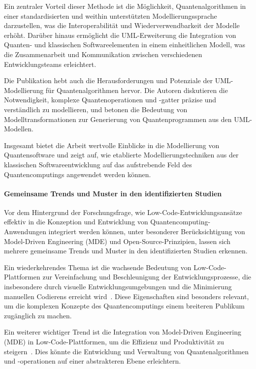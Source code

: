 Ein zentraler Vorteil dieser Methode ist die Möglichkeit, Quantenalgorithmen in einer standardisierten und 
weithin unterstützten Modellierungssprache darzustellen, was die Interoperabilität und Wiederverwendbarkeit 
der Modelle erhöht. Darüber hinaus ermöglicht die UML-Erweiterung die Integration von Quanten- und klassischen 
Softwareelementen in einem einheitlichen Modell, was die Zusammenarbeit und Kommunikation zwischen verschiedenen 
Entwicklungsteams erleichtert.

Die Publikation hebt auch die Herausforderungen und Potenziale der UML-Modellierung für Quantenalgorithmen hervor. 
Die Autoren diskutieren die Notwendigkeit, komplexe Quantenoperationen und -gatter präzise und verständlich zu 
modellieren, und betonen die Bedeutung von Modelltransformationen zur Generierung von Quantenprogrammen aus den UML-Modellen.

Insgesamt bietet die Arbeit wertvolle Einblicke in die Modellierung von Quantensoftware und zeigt auf, wie 
etablierte Modellierungstechniken aus der klassischen Softwareentwicklung auf das aufstrebende Feld des 
Quantencomputings angewendet werden können.

\paragraph{Gemeinsame Trends und Muster in den identifizierten Studien}

Vor dem Hintergrund der Forschungsfrage, wie Low-Code-Entwicklungsansätze effektiv in die Konzeption 
und Entwicklung von Quantencomputing-Anwendungen integriert werden können, unter besonderer Berücksichtigung 
von Model-Driven Engineering (MDE) und Open-Source-Prinzipien, lassen sich mehrere gemeinsame Trends und 
Muster in den identifizierten Studien erkennen.

Ein wiederkehrendes Thema ist die wachsende Bedeutung von Low-Code-Plattformen zur Vereinfachung und 
Beschleunigung der Entwicklungsprozesse, die insbesondere durch visuelle Entwicklungsumgebungen und 
die Minimierung manuellen Codierens erreicht wird~\cite{Khorram_2020, Sahay_2020, Bock_2021}. Diese 
Eigenschaften sind besonders relevant, um die komplexen Konzepte des Quantencomputings einem breiteren Publikum zugänglich zu machen.

Ein weiterer wichtiger Trend ist die Integration von Model-Driven Engineering (MDE) in Low-Code-Plattformen, 
um die Effizienz und Produktivität zu steigern~\cite{Gemeinhardt_2021, Moin_2021, Perez-Castillo_2022}. 
Dies könnte die Entwicklung und Verwaltung von Quantenalgorithmen und -operationen auf einer abstrakteren Ebene erleichtern.


